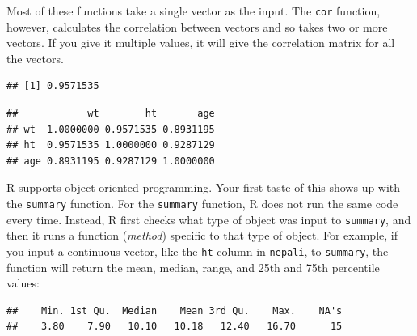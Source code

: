 \documentclass[]{book}
\makeatletter
\newenvironment{Shaded}{\begin{snugshade}}{\end{snugshade}}
\newcommand{\KeywordTok}[1]{\textcolor[rgb]{0.13,0.29,0.53}{\textbf{#1}}}
\newcommand{\DataTypeTok}[1]{\textcolor[rgb]{0.13,0.29,0.53}{#1}}
\newcommand{\StringTok}[1]{\textcolor[rgb]{0.31,0.60,0.02}{#1}}
\newcommand{\OperatorTok}[1]{\textcolor[rgb]{0.81,0.36,0.00}{\textbf{#1}}}
\newcommand{\NormalTok}[1]{#1}
\newenvironment{kframe}{%
\medskip{}
\setlength{\fboxsep}{.8em}
 \def\at@end@of@kframe{}%
 \ifinner\ifhmode%
  \def\at@end@of@kframe{\end{minipage}}%
  \begin{minipage}{\columnwidth}%
 \fi\fi%
 \def\FrameCommand##1{\hskip\@totalleftmargin \hskip-\fboxsep
 \colorbox{shadecolor}{##1}\hskip-\fboxsep
     \hskip-\linewidth \hskip-\@totalleftmargin \hskip\columnwidth}%
 \MakeFramed {\advance\hsize-\width
   \@totalleftmargin\z@ \linewidth\hsize
   \@setminipage}}%
 {\par\unskip\endMakeFramed%
 \at@end@of@kframe}
\renewenvironment{Shaded}{\begin{kframe}}{\end{kframe}}
\theoremstyle{definition}
\theoremstyle{definition}
\theoremstyle{definition}
\theoremstyle{remark}
\makeatother
\begin{document}
Most of these functions take a single vector as the input. The
\texttt{cor} function, however, calculates the correlation between
vectors and so takes two or more vectors. If you give it multiple
values, it will give the correlation matrix for all the vectors.

\begin{Shaded}
\end{Shaded}

\begin{verbatim}
## [1] 0.9571535
\end{verbatim}

\begin{Shaded}
\end{Shaded}

\begin{verbatim}
##            wt        ht       age
## wt  1.0000000 0.9571535 0.8931195
## ht  0.9571535 1.0000000 0.9287129
## age 0.8931195 0.9287129 1.0000000
\end{verbatim}

R supports object-oriented programming. Your first taste of this shows
up with the \texttt{summary} function. For the \texttt{summary}
function, R does not run the same code every time. Instead, R first
checks what type of object was input to \texttt{summary}, and then it
runs a function (\emph{method}) specific to that type of object. For
example, if you input a continuous vector, like the \texttt{ht} column
in \texttt{nepali}, to \texttt{summary}, the function will return the
mean, median, range, and 25th and 75th percentile values:

\begin{Shaded}
\end{Shaded}

\begin{verbatim}
##    Min. 1st Qu.  Median    Mean 3rd Qu.    Max.    NA's 
##    3.80    7.90   10.10   10.18   12.40   16.70      15
\end{verbatim}
\end{document}
